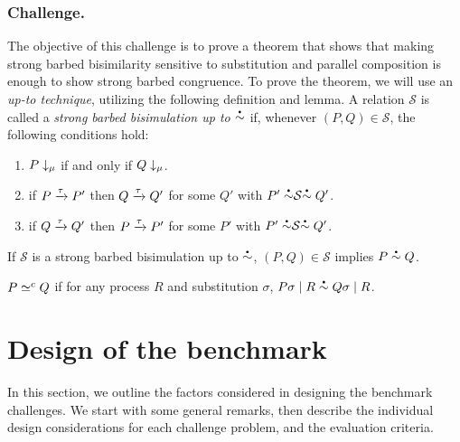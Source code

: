 \documentclass[runningheads]{llncs}
\begin{document}
\subsubsection{Challenge.}
The objective of this challenge is to prove a theorem that shows that
making strong barbed bisimilarity sensitive to substitution and
parallel composition is enough to show strong barbed
congruence.
To prove the theorem, we will use an \emph{up-to technique}, utilizing the following definition and lemma.
A relation \( \mathcal{S} \) is called a \emph{strong barbed bisimulation up to \( \sbbisim{}{} \)} if, whenever \( (P,Q) \in \mathcal{S} \), the following conditions hold:
\begin{enumerate}
\item \( P\downarrow_{\mu} \) if and only if \( Q\downarrow_{\mu} \).
\item if \( P \xrightarrow{\tau} P' \) then \( Q \xrightarrow{\tau} Q' \) for some \( Q' \) with \( \uptosbb{P'}{\mathcal{S}}{Q'} \).
\item if \( Q \xrightarrow{\tau} Q' \) then \( P \xrightarrow{\tau} P' \) for some \( P' \) with \( \uptosbb{P'}{\mathcal{S}}{Q'} \).
\end{enumerate}
\begin{lemma}\label{lemma:up-to}
  If \( \mathcal{S} \) is a strong barbed bisimulation up to \( \sbbisim{}{} \), \( (P,Q) \in \mathcal{S} \) implies \( \sbbisim{P}{Q} \).
\end{lemma}

\begin{theorem}\label{thm:coinduction}
  \( P \simeq^c Q \) if for any process \( R \) and
  substitution \( \sigma \),
  \(
  \sbbisim{\Ppar{\applysubst{\sigma}{P}}{R}}{\Ppar{\applysubst{\sigma}{Q}}{R}}
  \).
\end{theorem}

\section{Design of the benchmark}\label{sec:design-discussion}

In this section, we outline the factors considered in designing the
benchmark challenges. We start with some general remarks, then
describe the individual design considerations for each challenge problem,
and the evaluation criteria.
\end{document}
